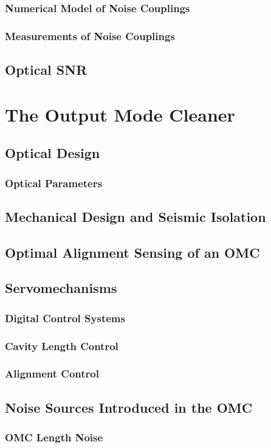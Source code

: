 \documentclass[12pt,vi,twoside]{mitthesis}
\begin{document}
\subsection{Numerical Model of Noise Couplings}
\subsection{Measurements of Noise Couplings}
\section{Optical SNR}

\chapter{The Output Mode Cleaner}
\section{Optical Design}
\subsection{Optical Parameters}
\section{Mechanical Design and Seismic Isolation}
\section{Optimal Alignment Sensing of an OMC}
\section{Servomechanisms}
\subsection{Digital Control Systems}
\subsection{Cavity Length Control}
\subsection{Alignment Control}
\section{Noise Sources Introduced in the OMC}
\subsection{OMC Length Noise}
\end{document}
